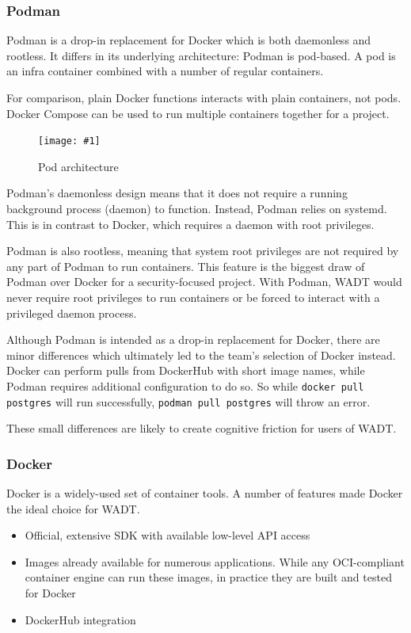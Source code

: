 \documentclass[12pt]{article}
\newcommand{\simplegraphic}[3] {
\begin{figure}[H]
	\centering
	\texttt{[image: \#1]}
	\caption{#2}
	\label{#3}
\end{figure}
}
\begin{document}
\subsubsection{Podman}
Podman is a drop-in replacement for Docker which is both daemonless and rootless. It differs in its underlying architecture: Podman is pod-based. A pod is an infra container combined with a number of regular containers.

For comparison, plain Docker functions interacts with plain containers, not pods. Docker Compose can be used to run multiple containers together for a project.

\simplegraphic{podman-pod-architecture}{Pod architecture}{fig:podman}

Podman's daemonless design means that it does not require a running background process (daemon) to function. Instead, Podman relies on systemd. This is in contrast to Docker, which requires a daemon with root privileges.

Podman is also rootless, meaning that system root privileges are not required by any part of Podman to run containers. This feature is the biggest draw of Podman over Docker for a security-focused project. With Podman, WADT would never require root privileges to run containers or be forced to interact with a privileged daemon process.

Although Podman is intended as a drop-in replacement for Docker, there are minor differences which ultimately led to the team's selection of Docker instead. Docker can perform pulls from DockerHub with short image names, while Podman requires additional configuration to do so. So while \texttt{docker pull postgres} will run successfully, \texttt{podman pull postgres} will throw an error.

These small differences are likely to create cognitive friction for users of WADT.


\subsubsection{Docker}
Docker is a widely-used set of container tools. A number of features made Docker the ideal choice for WADT.
\begin{itemize}
	\item Official, extensive SDK with available low-level API access
	\item Images already available for numerous applications. While any OCI-compliant container engine can run these images, in practice they are built and tested for Docker
	\item DockerHub integration
\end{itemize}
\end{document}
